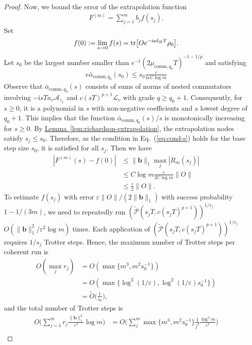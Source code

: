 \documentclass[11pt]{article}
\newcommand{\eq}[1]{(\ref{eq:#1})}
\newcommand{\lem}[1]{\hyperref[lem:#1]{Lemma~\ref*{lem:#1}}}
\renewcommand{\i}{\mathrm{i}}
\newcommand{\ad}{\mathrm{ad}}
\newcommand{\eps}{\varepsilon}
\newcommand{\mc}{\mathcal}
\begin{document}
\begin{proof}
    Now, we bound the error of the extrapolation function \begin{align*}
        F^{(m)} = \sum_{j=1}^m b_j f(s_j).
    \end{align*}
    Set \begin{align*}
        f(0) :=\lim_{s\to 0} f(s) = \tr[Oe^{-\i \ad_H T}\rho_0].
    \end{align*} Let $s_0$ be the largest number smaller than $e^{-1}(2\mu_{\mathrm{comm},q_0}T)^{-1-1/p}$ and satisfying \begin{align*}
        e\bar\alpha_{\mathrm{comm},q_0}(s_0)\le s_0\frac{\eps}{4eC \log m}
    \end{align*}
    Observe that $\bar\alpha_{\mathrm{comm}, q_0}(s)$ consists of sums of norms of nested commutators involving $-\i sT a_v \mc{A}_{\gamma_v}$ and $c(sT)^{p+1} \mc L_{v}$ with grade $q \ge q_0+1$. Consequently, for $s \ge 0$, it is a polynomial in $s$ with non-negative coefficients and a lowest degree of $q_0+1$. This implies that the function $\bar\alpha_{\mathrm{comm}, q_0}(s)/s$ is monotonically increasing for $s \ge 0$. 
    By \lem{richardson-extrapolation}, the extrapolation nodes satisfy $s_j \le s_0$. Therefore, as the condition in Eq.~\eq{cond-s} holds for the base step size $s_0$, it is satisfied for all $s_j$.
    Then we have \begin{align*}
        |F^{(m)}(s)-f(0)|&\le \|\mathbf{b}\|_1 \max_j|R_m(s_j)| \\
        &\le C\log m\frac{\eps}{2C\log m}\|O\|\\
        &\le \frac{\eps }{2}\|O\|.
    \end{align*}
    To estimate $f(s_j)$ with error $\eps\|O\|/(2\|\mathbf{b}\|_1)$ with success probability $1-1/(3m)$, we need to repeatedly run $(\tilde{\mc P}(s_jT, c(s_jT)^{p+1}))^{1/s_j}$ $O(\|\mathbf{b}\|_1^2/\eps^2\log m)$ times.  Each application of $(\tilde{\mc P}(s_jT, c(s_jT)^{p+1}))^{1/s_j}$ requires $1/s_j$ Trotter steps. Hence, the maximum number of Trotter steps per coherent run is \begin{align*}
        O(\max_j r_j) & = O( \max\{m^3, m^2s_0^{-1}\})\\
        &=O( \max\{\log^3(1/\eps), \log^2(1/\eps)s_0^{-1}\}) \\
        &= \widetilde{O}\Big(\frac{1}{s_0}\Big),
    \end{align*} and the total number of Trotter steps is \begin{align*}
        O\Big(\sum_{j=1}^m r_j\frac{\|\mathbf{b}\|_1^2}{\eps^2}\log m\Big) & = O\Big(\sum_j^{m} \max\{m^3, m^2s_0^{-1}\}\frac{1}{j^2}\frac{\log^3 m}{\eps^2}\Big)\\

\end{align*}
\end{proof}
\end{document}
